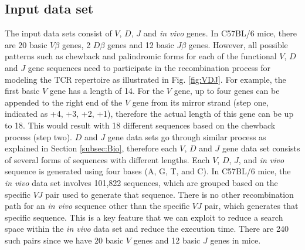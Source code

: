 \subsection{Input data set}\label{subsec:input}
The input data sets consist of $V$, $D$, $J$ and \emph{in vivo} genes. In C57BL/6 mice, there are 20 basic $V \beta$ genes, 2 $D \beta$ genes and 12 basic $J \beta$ genes. However, all possible patterns such as chewback and palindromic forms for each of the functional $V$, $D$ and $J$ gene sequences need to participate in the recombination process for modeling the TCR repertoire as illustrated in  Fig. \ref{fig:VDJ}. 
For example, the first basic $V$ gene has a length of 14. For the $V$ gene, up to four genes can be appended to the right end of the $V$ gene from its mirror strand (step one, indicated as +4, +3, +2, +1), therefore the actual length of this gene can be up to 18. This would result with 18 different sequences based on the chewback process (step two). $D$ and $J$ gene data sets go through similar process as explained in Section \ref{subsec:Bio}, therefore each $V$, $D$ and $J$ gene data set consists of several forms of sequences with different lengths.  Each $V$, $D$, $J$, and \emph{in vivo} sequence is generated using four bases (A, G, T, and C). In C57BL/6 mice, the \emph{in vivo} data set involves 101,822 sequences, which are grouped based on the specific $VJ$ pair used to generate that sequence. There is no other recombination path for an \emph{in vivo} sequence other than the specific $VJ$ pair, which generates that specific sequence. This is a key feature that we can exploit to reduce a search space within the \emph{in vivo} data set and reduce the execution time. There are 240 such pairs since we have 20 basic $V$ genes and 12 basic $J$ genes in mice.
